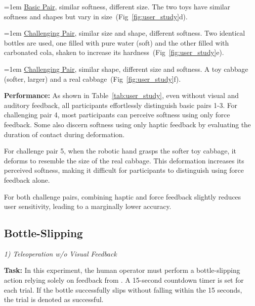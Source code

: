 \hangindent=1em  
\noindent\textbullet\hspace{0.5em}{Pair 3:} \ul{Basic Pair}, similar softness, different size. The two toys have similar softness and shapes but vary in size~(Fig~\ref{fig:user_study}d).

\hangindent=1em  
\noindent\textbullet\hspace{0.5em}{Pair 4:} \ul{Challenging Pair}, similar size and shape, different softness. Two identical bottles are used, one filled with pure water (soft) and the other filled with carbonated cola, shaken to increase its hardness~(Fig~\ref{fig:user_study}e).

\hangindent=1em  
\noindent\textbullet\hspace{0.5em}{Pair 5:} \ul{Challenging Pair}, similar shape, different size and softness. A toy cabbage (softer, larger) and a real cabbage~(Fig~\ref{fig:user_study}f).



\noindent \textbf{Performance:}
As shown in Table~\ref{tab:user_study}, even without visual and auditory feedback, all participants effortlessly distinguish basic pairs 1-3.
%
For challenging pair 4, most participants can perceive softness using only force feedback. Some also discern softness using only haptic feedback by evaluating the duration of contact during deformation.

For challenge pair 5, when the robotic hand grasps the softer toy cabbage, it deforms to resemble the size of the real cabbage. This deformation increases its perceived softness, making it difficult for participants to distinguish using force feedback alone.

For both challenge pairs, combining haptic and force feedback slightly reduces user sensitivity, leading to a marginally lower accuracy.


\subsection{Bottle-Slipping}
\label{sec::bottle-slipping}



\noindent\textit{1) Teleoperation w/o Visual Feedback}


\noindent \textbf{Task:} 
In this experiment, the human operator must perform a bottle-slipping action relying solely on feedback from \oursystem. A 15-second countdown timer is set for each trial. If the bottle successfully slips without falling within the 15 seconds, the trial is denoted as successful.

